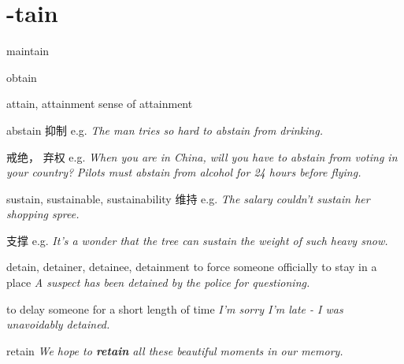 \chapter{-tain}

\begin{word}{maintain}
\end{word}

\begin{word}{obtain}
\end{word}

\begin{word}{attain, attainment}
    sense of attainment
\end{word}

\begin{word}{abstain}
    抑制
    e.g. \textit{The man tries so hard to abstain from drinking.}
    
    戒绝， 弃权
    e.g. \textit{When you are in China, will you have to abstain from voting in your country?}
    \textit{Pilots must abstain from alcohol for 24 hours before flying.}
\end{word}

\begin{word}{sustain, sustainable, sustainability}
维持
e.g. \textit{The salary couldn't sustain her shopping spree.}

支撑
e.g. \textit{It's a wonder that the tree can sustain the weight of such heavy snow.}

\end{word}

\begin{word}{detain, detainer, detainee, detainment}
to force someone officially to stay in a place
\textit{A suspect has been detained by the police for questioning.}
 
to delay someone for a short length of time
\textit{I'm sorry I'm late - I was unavoidably detained.}
\end{word}

\begin{word}{retain}
    \textit{We hope to \textbf{retain} all these beautiful moments in our memory.}
\end{word}





